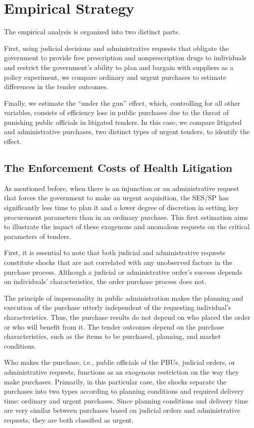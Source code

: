 \section{Empirical Strategy}
The empirical analysis is organized into two distinct parts.

First, using judicial decisions and administrative requests that obligate the government to provide free prescription and nonprescription drugs to individuals and restrict the government’s ability to plan and bargain with suppliers as a policy experiment, we compare ordinary and urgent purchases to estimate differences in the tender outcomes.

Finally, we estimate the “under the gun” effect, which, controlling for all other variables, consists of efficiency loss in public purchases due to the threat of punishing public officials in litigated tenders. In this case, we compare litigated and administrative purchases, two distinct types of urgent tenders, to identify the effect.

\subsection{The Enforcement Costs of Health Litigation}
As mentioned before, when there is an injunction or an administrative request that forces the government to make an urgent acquisition, the SES/SP has significantly less time to plan it and a lower degree of discretion in setting key procurement parameters than in an ordinary purchase. This first estimation aims to illustrate the impact of these exogenous and anomalous requests on the critical parameters of tenders.

First, it is essential to note that both judicial and administrative requests constitute shocks that are not correlated with any unobserved factors in the purchase process. Although a judicial or administrative order’s success depends on individuals’ characteristics, the order purchase process does not.

The principle of impersonality in public administration makes the planning and execution of the purchase utterly independent of the requesting individual’s characteristics. Thus, the purchase results do not depend on who placed the order or who will benefit from it. The tender outcomes depend on the purchase characteristics, such as the items to be purchased, planning, and market conditions.

Who makes the purchase, i.e., public officials of the PBUs, judicial orders, or administrative requests, functions as an exogenous restriction on the way they make purchases. Primarily, in this particular case, the shocks separate the purchases into two types according to planning conditions and required delivery time: ordinary and urgent purchases. Since planning conditions and delivery time are very similar between purchases based on judicial orders and administrative requests, they are both classified as urgent.

